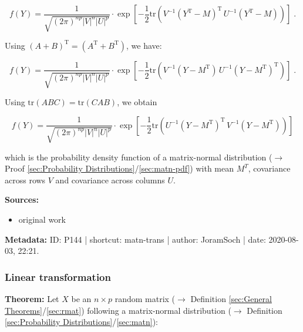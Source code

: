 \documentclass[a4paper,12pt,twoside]{book}
\begin{document}
\begin{equation} \label{eq:matn-trans-matn-pdf-Y-s1}
f(Y) = \frac{1}{\sqrt{(2\pi)^{np} |V|^n |U|^p}} \cdot \exp\left[-\frac{1}{2} \mathrm{tr}\left( V^{-1} (Y^\mathrm{T}-M)^\mathrm{T} \, U^{-1} (Y^\mathrm{T}-M) \right) \right] \; .
\end{equation}

Using $(A+B)^\mathrm{T} = (A^\mathrm{T} + B^\mathrm{T})$, we have:

\begin{equation} \label{eq:matn-trans-matn-pdf-Y-s2}
f(Y) = \frac{1}{\sqrt{(2\pi)^{np} |V|^n |U|^p}} \cdot \exp\left[-\frac{1}{2} \mathrm{tr}\left( V^{-1} (Y-M^\mathrm{T}) \, U^{-1} (Y-M^\mathrm{T})^\mathrm{T} \right) \right] \; .
\end{equation}

Using $\mathrm{tr}(ABC) = \mathrm{tr}(CAB)$, we obtain

\begin{equation} \label{eq:matn-trans-matn-pdf-Y-s3}
f(Y) = \frac{1}{\sqrt{(2\pi)^{np} |V|^n |U|^p}} \cdot \exp\left[-\frac{1}{2} \mathrm{tr}\left( U^{-1} (Y-M^\mathrm{T})^\mathrm{T} \, V^{-1} (Y-M^\mathrm{T}) \right) \right]
\end{equation}

which is the probability density function of a matrix-normal distribution ($\rightarrow$ Proof \ref{sec:Probability Distributions}/\ref{sec:matn-pdf}) with mean $M^T$, covariance across rows $V$ and covariance across columns $U$.


\vspace{1em}
\textbf{Sources:}
\begin{itemize}
\item original work\end{itemize}


\vspace{1em}
\textbf{Metadata:} ID: P144 | shortcut: matn-trans | author: JoramSoch | date: 2020-08-03, 22:21.
\vspace{1em}



\subsubsection[\textbf{Linear transformation}]{Linear transformation} \label{sec:matn-ltt}
\setcounter{equation}{0}

\textbf{Theorem:} Let $X$ be an $n \times p$ random matrix ($\rightarrow$ Definition \ref{sec:General Theorems}/\ref{sec:rmat}) following a matrix-normal distribution ($\rightarrow$ Definition \ref{sec:Probability Distributions}/\ref{sec:matn}):
\end{document}
